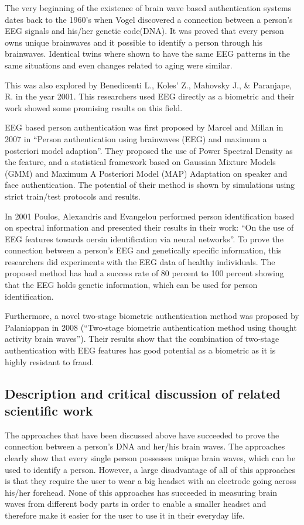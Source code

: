 \documentclass[a4paper,11pt]{article}
\begin{document}
The very beginning of the existence of brain wave based authentication systems dates back to the 1960's when Vogel discovered a connection between a person's EEG signals and his/her genetic code(DNA). It was proved that every person owns unique brainwaves and it possible to identify a person through his brainwaves. Identical twins where shown to have the same EEG patterns in the same situations and even changes related to aging were similar. 


This was also explored by Benedicenti L., Koles’ Z., Mahovsky J., \& Paranjape, R. in the year 2001. This researchers used EEG directly as a biometric and their work showed some promising results on this field.


EEG based person authentication was first proposed by Marcel and Millan in 2007 in “Person authentication using brainwaves (EEG) and maximum a posteriori model adaption”. They proposed the use of  Power Spectral Density as the feature, and a statistical framework based on Gaussian Mixture  Models (GMM) and Maximum A Posteriori Model (MAP) Adaptation on speaker and face  authentication. The potential of their method is shown by simulations using strict train/test protocols and results. 

In 2001 Poulos, Alexandris and Evangelou performed person identification based on spectral information and presented their results in their work: “On the use of EEG features towards oersin identification via neural networks”. To prove the connection between a person's EEG and genetically specific information, this researchers did experiments with the EEG data of healthy individuals. The proposed method has had a success rate of 80 percent to 100 percent showing that the EEG holds genetic information, which can be used for person identification.


Furthermore, a novel two-stage biometric authentication method was proposed by Palaniappan in 2008 (“Two-stage biometric authentication method using thought activity brain waves”). Their results show that the combination of two-stage authentication with EEG features has good potential as a biometric as it is highly resistant to fraud.

\subsection{Description and critical discussion of related scientific work}
The approaches that have been discussed above have succeeded to prove the connection between a person's DNA and her/his brain waves. The approaches clearly show that every single person possesses unique brain waves, which can be used to identify a person. However, a large disadvantage of all of this approaches is that they require the user to wear a big headset with an electrode going across his/her forehead. None of this approaches has succeeded in measuring brain waves from different body parts in order to enable a smaller headset and therefore make it easier for the user to use it in their everyday life.
\end{document}
